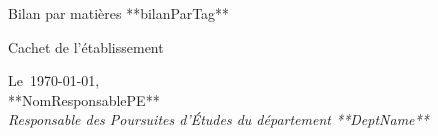 \newpage %


\begin{rubrique}{Bilan par matières}
**bilanParTag**
\end{rubrique}


\begin{rubrique}{Cachet de l'établissement}
\begin{flushright}
Le~\today,\\
**NomResponsablePE**~\\
\textit{Responsable des Poursuites d'Études du département **DeptName**}
\end{flushright}
\vspace{0.5cm}
\end{rubrique}


